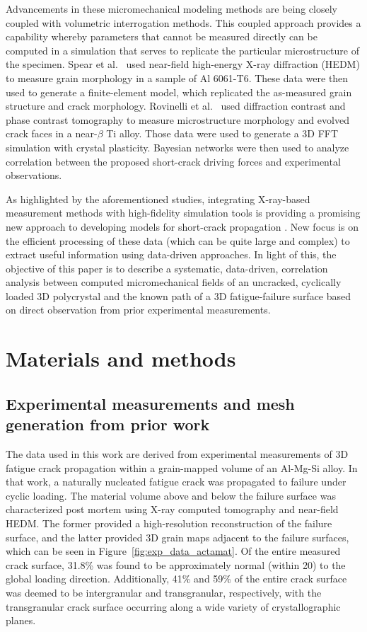 Advancements in these micromechanical modeling methods are being closely coupled with volumetric interrogation methods.  This coupled approach provides a capability whereby parameters that cannot be measured directly can be computed in a simulation that serves to replicate the particular microstructure of the specimen. Spear et al.~\cite{spear2016} used near-field high-energy X-ray diffraction (HEDM) to measure grain morphology in a sample of Al 6061-T6. These data were then used to generate a finite-element model, which replicated the as-measured grain structure and crack morphology. Rovinelli et al.~\cite{Rovinelli_2017} used diffraction contrast and phase contrast tomography to measure microstructure morphology and evolved crack faces in a near-$\beta$ Ti alloy.  Those data were used to generate a 3D FFT simulation with crystal plasticity.  Bayesian networks were then used to analyze correlation between the proposed short-crack driving forces and experimental observations. 

As highlighted by the aforementioned studies, integrating X-ray-based measurement methods with high-fidelity simulation tools is providing a promising new approach to developing models for short-crack propagation \cite{Turner_2017}. New focus is on the efficient processing of these data (which can be quite large and complex) to extract useful information using data-driven approaches. In light of this, the objective of this paper is to describe a systematic, data-driven, correlation analysis between computed micromechanical fields of an uncracked, cyclically loaded 3D polycrystal and the known path of a 3D fatigue-failure surface based on direct observation from prior experimental measurements.

\section{Materials and methods}\label{methods}
\subsection{Experimental measurements and mesh generation from prior work} \label{prior_work}
The data used in this work are derived from experimental measurements \cite{spear2014} of 3D fatigue crack propagation within a grain-mapped volume of an Al-Mg-Si alloy. In that work, a naturally nucleated fatigue crack was propagated to failure under cyclic loading. The material volume above and below the failure surface was characterized post mortem using X-ray computed tomography and near-field HEDM. The former provided a high-resolution reconstruction of the failure surface, and the latter provided 3D grain maps adjacent to the failure surfaces, which can be seen in Figure~\ref{fig:exp_data_actamat}. Of the entire measured crack surface, 31.8\% was found to be approximately normal (within 20\degrees) to the global loading direction. Additionally, 41\% and 59\% of the entire crack surface was deemed to be intergranular and transgranular, respectively, with the transgranular crack surface occurring along a wide variety of crystallographic planes.

